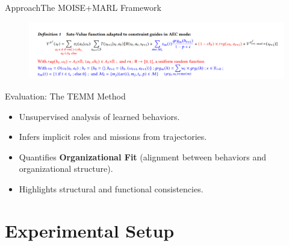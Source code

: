 \documentclass[9pt, aspectratio=169]{beamer}
\begin{document}
\begin{frame}{Approach}{The MOISE+MARL Framework}
  \begin{figure}
      \hspace{-0.76cm}
      \includegraphics[width=1.05\linewidth]{figures/modified_state_value_function.png}
  \end{figure}
\end{frame}

\begin{frame}{Evaluation: The TEMM Method}
  \begin{itemize}
    \item Unsupervised analysis of learned behaviors.
    \item Infers implicit roles and missions from trajectories.
    \item Quantifies \textbf{Organizational Fit} (alignment between behaviors and organizational structure).
    \item Highlights structural and functional consistencies.
  \end{itemize}
\end{frame}

\section{Experimental Setup}
\end{document}
